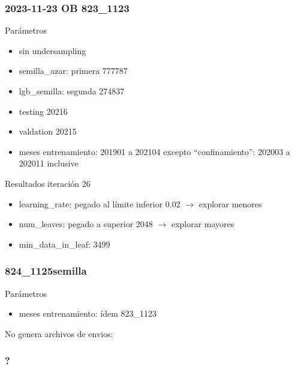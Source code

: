 \documentclass[aspectratio=43]{beamer}
\begin{document}
\begin{frame}
	\frametitle{2023-11-23 OB 823\_1123}
	Parámetros
	\begin{itemize}
		\item sin undersampling
		\item semilla\_azar: primera 777787
		\item lgb\_semilla: segunda 274837
		\item testing 20216
		\item valdation 20215
		\item meses entrenamiento: 201901 a 202104 excepto ``confinamiento'': 202003 a 202011 inclusive
	\end{itemize}
	Resultados iteración 26
	\begin{itemize}
		\item learning\_rate: pegado al límite inferior 0.02  \(\rightarrow\) explorar menores
		\item num\_leaves: pegado a superior 2048 \(\rightarrow\) explorar mayores
		\item min\_data\_in\_leaf: 3499 
	\end{itemize}
\end{frame}


\begin{frame}
	\frametitle{824\_1125semilla}
	Parámetros
	\begin{itemize}
		\item meses entrenamiento: ídem 823\_1123
	\end{itemize}
	No genera archivos de envios:
\end{frame}


\begin{frame}
	\frametitle{?}
\end{frame}
\end{document}
